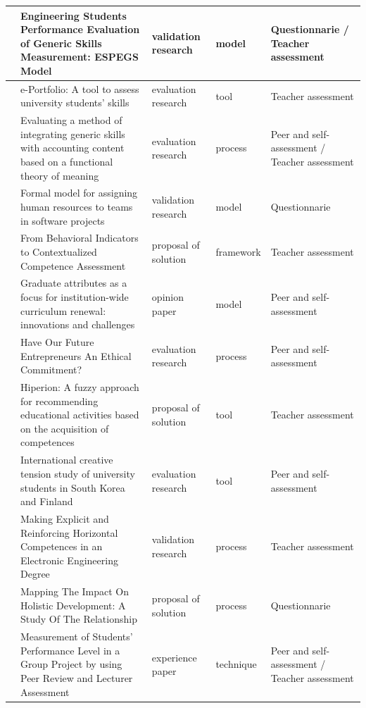 \begin{landscape}
\begin{center}
\begin{longtable}{| m{2.5cm} | m{9cm} | m{4cm} | m{2.5cm} | m{3.5cm} |}
    \hline
    \cite{rashid2008engineering} & Engineering Students Performance Evaluation of Generic Skills Measurement: ESPEGS Model & validation research & model & Questionnarie / Teacher assessment \\
    \hline
    \cite{rodriguez2010portfolio} & e-Portfolio: A tool to assess university students' skills & evaluation research & tool & Teacher assessment \\
    \hline
    \cite{sin2007evaluating} & Evaluating a method of integrating generic skills with accounting content based on a functional theory of meaning & evaluation research & process & Peer and self-assessment / Teacher assessment \\
    \hline
    \cite{andre2011formal} & Formal model for assigning human resources to teams in software projects & validation research & model & Questionnarie \\
    \hline
    \cite{bedek2011behavioral} & From Behavioral Indicators to Contextualized Competence Assessment & proposal of solution & framework & Teacher assessment \\
    \hline
    \cite{oliver2013graduate} & Graduate attributes as a focus for institution-wide curriculum renewal: innovations and challenges & opinion paper & model & Peer and self-assessment \\
    \hline
    \cite{marquez2010have} & Have Our Future Entrepreneurs An Ethical Commitment? & evaluation research & process & Peer and self-assessment \\
    \hline
    \cite{serrano2013hiperion} & Hiperion: A fuzzy approach for recommending educational activities based on the acquisition of competences & proposal of solution & tool & Teacher assessment \\
    \hline
    \cite{chang2009international} & International creative tension study of university students in South Korea and Finland & evaluation research & tool & Peer and self-assessment \\
    \hline
    \cite{portilla2014making} & Making Explicit and Reinforcing Horizontal Competences in an Electronic Engineering Degree & validation research & process & Teacher assessment \\
    \hline
    \cite{so2011mapping} & Mapping The Impact On Holistic Development: A Study Of The Relationship & proposal of solution & process & Questionnarie \\
    \hline
    \cite{khamis2012measurement} & Measurement of Students' Performance Level in a Group Project by using Peer Review and Lecturer Assessment & experience paper & technique & Peer and self-assessment / Teacher assessment \\

\end{longtable}
\end{center}
\end{landscape}
